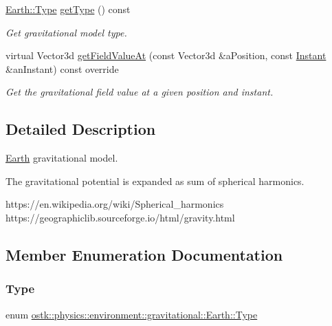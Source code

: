 \begin{DoxyCompactItemize}
\hyperlink{classostk_1_1physics_1_1environment_1_1gravitational_1_1_earth_a9895df78b5c5aab5e981bf765f8c0f05}{Earth\+::\+Type} \hyperlink{classostk_1_1physics_1_1environment_1_1gravitational_1_1_earth_aa65dd2a5ce980e8a4f7f502387c1ff61}{get\+Type} () const
\begin{DoxyCompactList}\small\item\em Get gravitational model type. \end{DoxyCompactList}\item 
virtual Vector3d \hyperlink{classostk_1_1physics_1_1environment_1_1gravitational_1_1_earth_a9e536649566761f4bdd467993abfcedd}{get\+Field\+Value\+At} (const Vector3d \&a\+Position, const \hyperlink{classostk_1_1physics_1_1time_1_1_instant}{Instant} \&an\+Instant) const override
\begin{DoxyCompactList}\small\item\em Get the gravitational field value at a given position and instant. \end{DoxyCompactList}\end{DoxyCompactItemize}


\subsection{Detailed Description}
\hyperlink{classostk_1_1physics_1_1environment_1_1gravitational_1_1_earth}{Earth} gravitational model. 

The gravitational potential is expanded as sum of spherical harmonics.

https\+://en.wikipedia.\+org/wiki/\+Spherical\+\_\+harmonics https\+://geographiclib.sourceforge.\+io/html/gravity.html 

\subsection{Member Enumeration Documentation}
\mbox{\label{classostk_1_1physics_1_1environment_1_1gravitational_1_1_earth_a9895df78b5c5aab5e981bf765f8c0f05}} 
\subsubsection{\texorpdfstring{Type}{Type}}
{\footnotesize\ttfamily enum \hyperlink{classostk_1_1physics_1_1environment_1_1gravitational_1_1_earth_a9895df78b5c5aab5e981bf765f8c0f05}{ostk\+::physics\+::environment\+::gravitational\+::\+Earth\+::\+Type}\hspace{0.3cm}{\ttfamily [strong]}}

